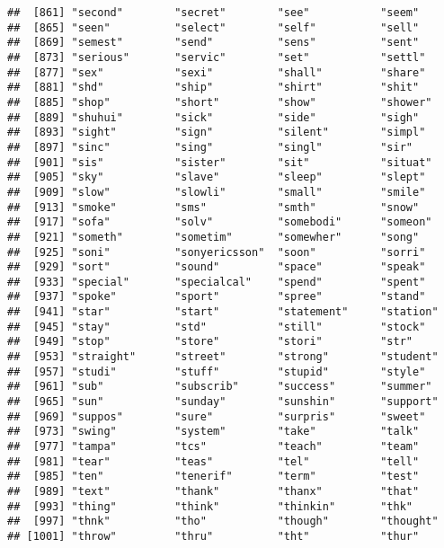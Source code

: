\documentclass[]{article}
\begin{document}
\begin{verbatim}
##  [861] "second"        "secret"        "see"           "seem"         
##  [865] "seen"          "select"        "self"          "sell"         
##  [869] "semest"        "send"          "sens"          "sent"         
##  [873] "serious"       "servic"        "set"           "settl"        
##  [877] "sex"           "sexi"          "shall"         "share"        
##  [881] "shd"           "ship"          "shirt"         "shit"         
##  [885] "shop"          "short"         "show"          "shower"       
##  [889] "shuhui"        "sick"          "side"          "sigh"         
##  [893] "sight"         "sign"          "silent"        "simpl"        
##  [897] "sinc"          "sing"          "singl"         "sir"          
##  [901] "sis"           "sister"        "sit"           "situat"       
##  [905] "sky"           "slave"         "sleep"         "slept"        
##  [909] "slow"          "slowli"        "small"         "smile"        
##  [913] "smoke"         "sms"           "smth"          "snow"         
##  [917] "sofa"          "solv"          "somebodi"      "someon"       
##  [921] "someth"        "sometim"       "somewher"      "song"         
##  [925] "soni"          "sonyericsson"  "soon"          "sorri"        
##  [929] "sort"          "sound"         "space"         "speak"        
##  [933] "special"       "specialcal"    "spend"         "spent"        
##  [937] "spoke"         "sport"         "spree"         "stand"        
##  [941] "star"          "start"         "statement"     "station"      
##  [945] "stay"          "std"           "still"         "stock"        
##  [949] "stop"          "store"         "stori"         "str"          
##  [953] "straight"      "street"        "strong"        "student"      
##  [957] "studi"         "stuff"         "stupid"        "style"        
##  [961] "sub"           "subscrib"      "success"       "summer"       
##  [965] "sun"           "sunday"        "sunshin"       "support"      
##  [969] "suppos"        "sure"          "surpris"       "sweet"        
##  [973] "swing"         "system"        "take"          "talk"         
##  [977] "tampa"         "tcs"           "teach"         "team"         
##  [981] "tear"          "teas"          "tel"           "tell"         
##  [985] "ten"           "tenerif"       "term"          "test"         
##  [989] "text"          "thank"         "thanx"         "that"         
##  [993] "thing"         "think"         "thinkin"       "thk"          
##  [997] "thnk"          "tho"           "though"        "thought"      
## [1001] "throw"         "thru"          "tht"           "thur"         

\end{verbatim}
\end{document}
